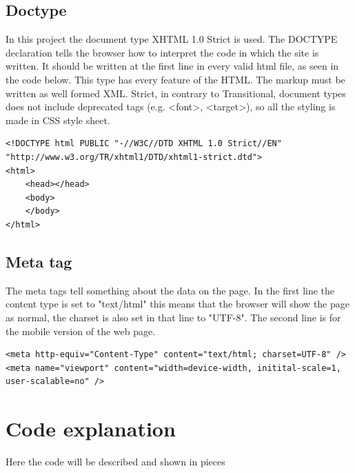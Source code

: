 \subsection{Doctype}
In this project the document type XHTML 1.0 Strict is used. The DOCTYPE declaration tells the browser how to interpret the code in which the site is written. It should be written at the first line in every valid html file, as seen in the code below. This type has every feature of the HTML. The markup must be written as well formed XML. Strict, in contrary to Transitional, document types does not include deprecated tags (e.g. \textless font\textgreater , \textless target\textgreater), so all the styling is made in CSS style sheet.
\begin{lstlisting}
<!DOCTYPE html PUBLIC "-//W3C//DTD XHTML 1.0 Strict//EN" "http://www.w3.org/TR/xhtml1/DTD/xhtml1-strict.dtd">
<html>
	<head></head>
	<body>
	</body>
</html>
\end{lstlisting}

\subsection{Meta tag}
The meta tags tell something about the data on the page. In the first line the content type is set to "text/html" this means that the browser will show the page as normal, the charset is also set in that line to "UTF-8". The second line is for the mobile version of the web page.
\begin{lstlisting}
<meta http-equiv="Content-Type" content="text/html; charset=UTF-8" />
<meta name="viewport" content="width=device-width, initital-scale=1, user-scalable=no" />
\end{lstlisting}

\section{Code explanation}
Here the code will be described and shown in pieces
